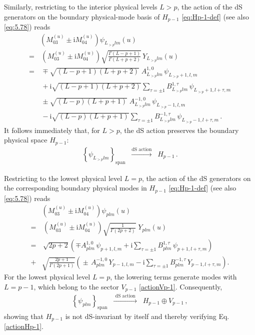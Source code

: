 \documentclass[aps,twocolumn,nofootinbib]{revtex4}
\begin{document}
{\begin{appendix}
Similarly, restricting to the interior physical levels $L>p$, the action of the dS generators on the boundary physical-mode basis of $H_{p-1}$ \eqref{eq:Hp-1-def} (see also \eqref{eq:5.78}) reads
\begin{align}
    &\!\!\!\!\!\!\! \left(M_{03}^{(u)} \pm \mathrm{i}M_{04}^{(u)}\right) \psi^{}_{L^{}_{>p}lm}(u) \nonumber\\[3pt]
    =&\, \left(M_{03}^{(u)} \pm \mathrm{i}M_{04}^{(u)}\right)
    \sqrt{\frac{\Gamma(L-p+1)}{\Gamma(L+p+2)}}\,
    Y_{L^{}_{>p}lm}(u) \nonumber\\[3pt]
    =&\, \mp \sqrt{(L-p+1)(L+p+2)}
    \;A^{1,0}_{L^{}_{>p}lm}\,
    \psi^{}_{L^{}_{>p}+1,l,m} \nonumber\\[3pt]
    &\, +\mathrm{i}\sqrt{(L-p+1)(L+p+2)}
    \sum_{\tau=\pm1}
    B^{1,\tau}_{L^{}_{>p}lm}\,
    \psi^{}_{L^{}_{>p}+1,l+\tau,m} \nonumber\\[3pt]
    &\, \pm\sqrt{(L-p)(L+p+1)}
    \;A^{-1,0}_{L^{}_{>p}lm}\,
    \psi^{}_{L^{}_{>p}-1,l,m} \nonumber\\[3pt]
    &\, -\mathrm{i} \sqrt{(L-p)(L+p+1)}
    \sum_{\tau=\pm1}
    B^{-1,\tau}_{L^{}_{>p}lm}\,
    \psi^{}_{L^{}_{>p}-1,l+\tau,m}\,.
\end{align}
It follows immediately that, for $L>p$, the dS action preserves the boundary physical space $H_{p-1}$:
\begin{align}
    \left\{\psi^{}_{L^{}_{>p}lm}\right\}_{\mathrm{span}}
    \;\;\xrightarrow[]{\text{dS action}}\;\;
    H_{p-1}\,.
\end{align}

Restricting to the lowest physical level $L=p$, the action of the dS generators on the corresponding boundary physical modes in $H_{p-1}$ \eqref{eq:Hp-1-def} (see also \eqref{eq:5.78}) reads
\begin{align}
    &\!\!\!\!\!\!\! \left(M_{03}^{(u)} \pm \mathrm{i}M_{04}^{(u)}\right) \psi^{}_{plm}(u) \nonumber\\[3pt]
    =&\, \left(M_{03}^{(u)} \pm \mathrm{i}M_{04}^{(u)}\right)
    \sqrt{\frac{1}{\Gamma(2p+2)}}\;
    Y_{plm}(u) \nonumber\\[3pt]
    =&\, \sqrt{2p+2} \left( \mp A^{1,0}_{plm}\, \psi^{}_{p+1,l,m} + \mathrm{i} \sum_{\tau=\pm1} B^{1,\tau}_{plm}\, \psi^{}_{p+1,l+\tau,m} \right) \nonumber\\[3pt]
    +& \sqrt{\!\frac{2p+1}{\Gamma(2p+1)}} \!\!\left(\!\pm \, A^{-1,0}_{plm}\, Y_{p-1,l,m} -\mathrm{i}\!\! \sum_{\tau=\pm1}\!\! B^{-1,\tau}_{plm}\, Y_{p-1,l+\tau,m} \right) .
\end{align}
For the lowest physical level $L=p$, the lowering terms generate modes with $L=p-1$, which belong to the sector $V_{p-1}$ \eqref{actionVp-1}. Consequently,
\begin{align}
    \left\{\psi^{}_{plm}\right\}_{\mathrm{span}}
    \;\;\xrightarrow[]{\text{ dS action }}\;\;
    H_{p-1}\oplus V_{p-1}\,,
\end{align}
showing that $H_{p-1}$ is not dS-invariant by itself and thereby verifying Eq. \eqref{actionHp-1}.



\end{appendix}}
\end{document}
